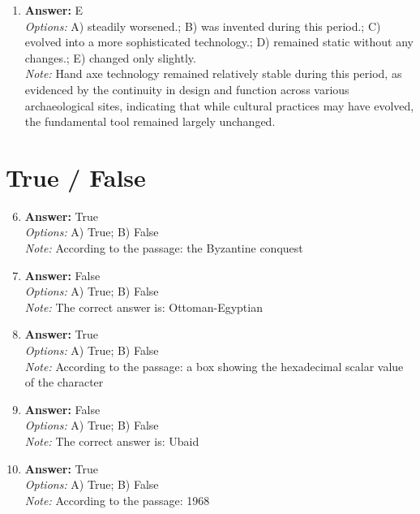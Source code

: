 \documentclass[12pt]{article}
\begin{document}
\begin{enumerate}[label=\arabic*.]
\\ \textit{Note:} The correct answer highlights the ritualistic nature of Inca human sacrifice, emphasizing that it was often integrated into elite-sponsored feasts that served both as a display of power and a means of justifying the sacrificial act, particularly involving captives of war.
\item \textbf{Answer:} E
\\ \textit{Options:} A) steadily worsened.; B) was invented during this period.; C) evolved into a more sophisticated technology.; D) remained static without any changes.; E) changed only slightly.
\\ \textit{Note:} Hand axe technology remained relatively stable during this period, as evidenced by the continuity in design and function across various archaeological sites, indicating that while cultural practices may have evolved, the fundamental tool remained largely unchanged.
\end{enumerate}

\section*{True / False}
\begin{enumerate}[label=\arabic*.]
\setcounter{enumi}{5}
\item \textbf{Answer:} True
\\ \textit{Options:} A) True; B) False
\\ \textit{Note:} According to the passage: the Byzantine conquest
\item \textbf{Answer:} False
\\ \textit{Options:} A) True; B) False
\\ \textit{Note:} The correct answer is: Ottoman-Egyptian
\item \textbf{Answer:} True
\\ \textit{Options:} A) True; B) False
\\ \textit{Note:} According to the passage: a box showing the hexadecimal scalar value of the character
\item \textbf{Answer:} False
\\ \textit{Options:} A) True; B) False
\\ \textit{Note:} The correct answer is: Ubaid
\item \textbf{Answer:} True
\\ \textit{Options:} A) True; B) False
\\ \textit{Note:} According to the passage: 1968
\end{enumerate}
\end{document}
